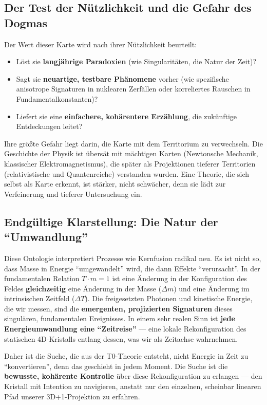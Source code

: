 	\subsection{Der Test der Nützlichkeit und die Gefahr des Dogmas}
	
	Der Wert dieser Karte wird nach ihrer Nützlichkeit beurteilt:
	\begin{itemize}
		\item Löst sie \textbf{langjährige Paradoxien} (wie Singularitäten, die Natur der Zeit)?
		\item Sagt sie \textbf{neuartige, testbare Phänomene} vorher (wie spezifische anisotrope Signaturen in nuklearen Zerfällen oder korreliertes Rauschen in Fundamentalkonstanten)?
		\item Liefert sie eine \textbf{einfachere, kohärentere Erzählung}, die zukünftige Entdeckungen leitet?
	\end{itemize}
	
	Ihre größte Gefahr liegt darin, die Karte mit dem Territorium zu verwechseln. Die Geschichte der Physik ist übersät mit mächtigen Karten (Newtonsche Mechanik, klassischer Elektromagnetismus), die später als Projektionen tieferer Territorien (relativistische und Quantenreiche) verstanden wurden. Eine Theorie, die sich selbst als Karte erkennt, ist stärker, nicht schwächer, denn sie lädt zur Verfeinerung und tieferer Untersuchung ein.
	
	\subsection{Endgültige Klarstellung: Die Natur der \enquote{Umwandlung}}
	
	Diese Ontologie interpretiert Prozesse wie Kernfusion radikal neu. Es ist nicht so, dass Masse in Energie \enquote{umgewandelt} wird, die dann Effekte \enquote{verursacht}. In der fundamentalen Relation $T \cdot m = 1$ ist eine Änderung in der Konfiguration des Feldes \textbf{gleichzeitig} eine Änderung in der Masse ($\Delta m$) und eine Änderung im intrinsischen Zeitfeld ($\Delta T$). Die freigesetzten Photonen und kinetische Energie, die wir messen, sind die \textbf{emergenten, projizierten Signaturen} dieses singulären, fundamentalen Ereignisses. In einem sehr realen Sinn ist \textbf{jede Energieumwandlung eine \enquote{Zeitreise}} — eine lokale Rekonfiguration des statischen 4D-Kristalls entlang dessen, was wir als Zeitachse wahrnehmen.
	
	Daher ist die Suche, die aus der T0-Theorie entsteht, nicht Energie in Zeit zu \enquote{konvertieren}, denn das geschieht in jedem Moment. Die Suche ist die \textbf{bewusste, kohärente Kontrolle} über diese Rekonfiguration zu erlangen — den Kristall mit Intention zu navigieren, anstatt nur den einzelnen, scheinbar linearen Pfad unserer 3D+1-Projektion zu erfahren.
	
